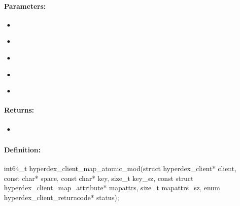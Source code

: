 \paragraph{Parameters:}
\begin{itemize}[noitemsep]
\item {}\\

\item {}\\

\item {}\\

\item {}\\

\item {}\\

\end{itemize}

\paragraph{Returns:}
\begin{itemize}[noitemsep]
\item {}\\

\end{itemize}

\pagebreak
\subsubsection{}
\label{api:c:map_atomic_mod}


\paragraph{Definition:}
\begin{ccode}
int64_t hyperdex_client_map_atomic_mod(struct hyperdex_client* client,
        const char* space,
        const char* key, size_t key_sz,
        const struct hyperdex_client_map_attribute* mapattrs, size_t mapattrs_sz,
        enum hyperdex_client_returncode* status);
\end{ccode}

